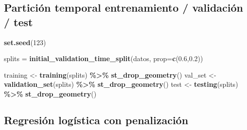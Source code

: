 \documentclass[12pt,a4paper,]{book}
\newenvironment{Shaded}{\begin{snugshade}}{\end{snugshade}}
\newcommand{\AttributeTok}[1]{\textcolor[rgb]{0.13,0.29,0.53}{#1}}
\newcommand{\DecValTok}[1]{\textcolor[rgb]{0.00,0.00,0.81}{#1}}
\newcommand{\FloatTok}[1]{\textcolor[rgb]{0.00,0.00,0.81}{#1}}
\newcommand{\FunctionTok}[1]{\textcolor[rgb]{0.13,0.29,0.53}{\textbf{#1}}}
\newcommand{\NormalTok}[1]{#1}
\newcommand{\OtherTok}[1]{\textcolor[rgb]{0.56,0.35,0.01}{#1}}
\newcommand{\SpecialCharTok}[1]{\textcolor[rgb]{0.81,0.36,0.00}{\textbf{#1}}}
\numberwithin{dummy}{section}
\theoremstyle{ocrenumbox}
\theoremstyle{blacknumex}
\theoremstyle{blacknumbox}
\theoremstyle{ocrenum}
\theoremstyle{ocrenum}
\begin{document}
\hypertarget{particiuxf3n-temporal-entrenamiento-validaciuxf3n-test}{%
\subsection{Partición temporal entrenamiento / validación /
test}\label{particiuxf3n-temporal-entrenamiento-validaciuxf3n-test}}

\begin{Shaded}
\begin{Highlighting}[]
\FunctionTok{set.seed}\NormalTok{(}\DecValTok{123}\NormalTok{)}

\NormalTok{splits }\OtherTok{=} \FunctionTok{initial\_validation\_time\_split}\NormalTok{(datos, }
                                       \AttributeTok{prop=}\FunctionTok{c}\NormalTok{(}\FloatTok{0.6}\NormalTok{,}\FloatTok{0.2}\NormalTok{))}

\NormalTok{training }\OtherTok{\textless{}{-}} \FunctionTok{training}\NormalTok{(splits) }\SpecialCharTok{\%\textgreater{}\%}  \FunctionTok{st\_drop\_geometry}\NormalTok{()}
\NormalTok{val\_set }\OtherTok{\textless{}{-}} \FunctionTok{validation\_set}\NormalTok{(splits) }\SpecialCharTok{\%\textgreater{}\%} \FunctionTok{st\_drop\_geometry}\NormalTok{()}
\NormalTok{test  }\OtherTok{\textless{}{-}} \FunctionTok{testing}\NormalTok{(splits) }\SpecialCharTok{\%\textgreater{}\%} \FunctionTok{st\_drop\_geometry}\NormalTok{()}
\end{Highlighting}
\end{Shaded}

\hypertarget{regresiuxf3n-loguxedstica-con-penalizaciuxf3n}{%
\subsection{Regresión logística con
penalización}\label{regresiuxf3n-loguxedstica-con-penalizaciuxf3n}}
\end{document}
